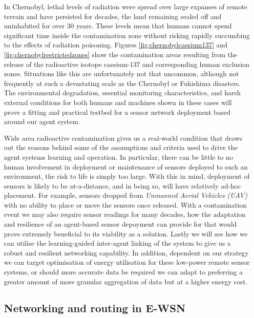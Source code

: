 In Chernobyl, lethal levels of radiation were spread over large expanses of remote terrain and have persisted for decades, the land remaining sealed off and uninhabited for over 30 years. These levels mean that humans cannot spend significant time inside the contamination zone without risking rapidly succumbing to the effects of radiation poisoning. Figures \ref{fig:chernobylcaesium137} and \ref{fig:chernobylrestrictedzones} show the contamination areas resulting from the release of the radioactive isotope caesium-137 and corresponding human exclusion zones. Situations like this are unfortunately not that uncommon, although not frequently at such a devastating scale as the Chernobyl or Fukishima disasters. The environmental degradation, essential monitoring characteristics, and harsh external conditions for both humans and machines shown in these cases will prove a fitting and practical testbed for a sensor network deployment based around our agent system.
\newline
\newline


Wide area radioactive contamination gives us a real-world condition that draws out the reasons behind some of the assumptions and criteria used to drive the agent systems learning and operation. In particular, there can be little to no human involvement in deployment or maintenance of sensors deployed to such an environment, the risk to life is simply too large. With this in mind, deployment of sensors is likely to be at-a-distance, and in being so, will have relatively ad-hoc placement. For example, sensors dropped from \textit{Unmanned Aerial Vehicles (UAV)} with no ability to place or move the sensors once released. With a contamination event we may also require sensor readings for many decades, how the adaptation and resilience of an agent-based sensor depoyment can provide for that would prove extremely beneficial to its viability as a solution. Lastly we will see how we can utilise the learning-guided inter-agent linking of the system to give us a robust and resilient networking capability. In addition, dependent on our strategy we can target optimisation of energy utilisation for these low-power remote sensor systems, or should more accurate data be required we can adapt to preferring a greater amount of more granular aggregation of data but at a higher energy cost. 




\subsection{Networking and routing in E-WSN}

